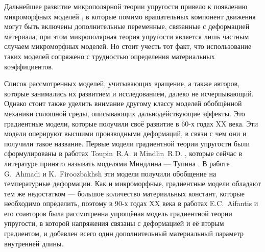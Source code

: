 \ifsynopsis
\else
Дальнейшее развитие микрополярной теории упругости привело к появлению микроморфных моделей \cite{Eringen4, Micromorph1, Micromorph2}, в которые помимо вращательных компонент движения могут быть включены дополнительные переменные, связанные с деформацией материала, при этом микрополярная теория упругости является лишь частным случаем микроморфных моделей. Но стоит учесть тот факт, что использование таких моделей сопряжено с трудностью определения материальных коэффициентов.
\fi

\ifsynopsis
\else
Список рассмотренных моделей, учитывающих вращение, а также авторов, которые занимались их развитием и исследованием, далеко не исчерпывающий. Однако стоит также уделить внимание другому классу моделей обобщённой механики сплошной среды, описывающих дальнодействующие эффекты. Это градиентные модели, которые получили своё развитие в 60-х годах XX века. Эти модели оперируют высшими производными деформаций, в связи с чем они и получили такое название. Первые модели градиентной теории упругости были сформулированы в работах Toupin~R.A. \cite{Toupin} и Mindlin~R.D. \cite{Mindlin4, Mindlin5}, которые сейчас в литературе принято называть моделями Миндлина --- Тупина \cite{ToupinMindlin1, ToupinMindlin2, ToupinMindlin3}. В работе G.~Ahmadi и K.~Firoozbakhsh \cite{GradientThermoelasticity} эти модели получили обобщение на температурные деформации. Как и микроморфные, градиентные модели обладают тем же недостатком --- большое количество материальных констант, которые необходимо определить, поэтому в 90-х годах XX века в работах E.C.~Aifantis и его соавторов \cite{Aifantis1, Aifantis2} была рассмотренна упрощёная модель градиентной теории упругости, в которой напряжения связаны с деформацией и её вторым градиентом, и добавлен всего один дополнительный материальный параметр внутренней длины.
\fi

